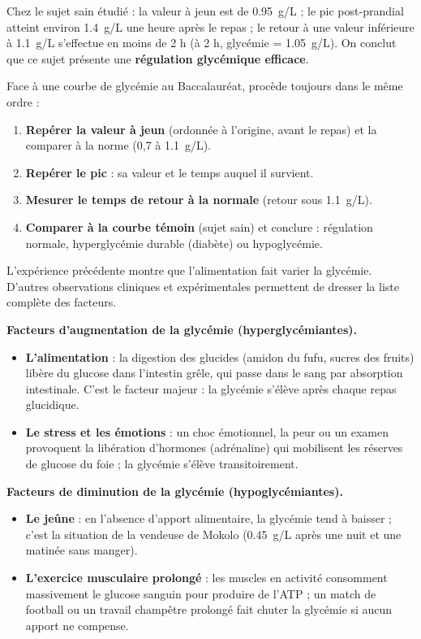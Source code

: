 \documentclass[11pt]{article}
\newcounter{popsec}
\newcounter{popsub}
\newcommand{\courssub}[1]{%
  \stepcounter{popsub}%
  \par\vspace{9pt}\noindent{\popxbold\fontsize{11.5}{13}\selectfont\color{popink}{\color{poporange}\thepopsec.\thepopsub}\hspace{6pt}#1}\par\nopagebreak\vspace{4pt}
}
\begin{document}
\begin{exemplebox}
Chez le sujet sain étudié : la valeur à jeun est de \SI{0,95}{g/L} ; le pic post-prandial atteint environ \SI{1,4}{g/L} une heure après le repas ; le retour à une valeur inférieure à \SI{1,1}{g/L} s'effectue en moins de 2 h (à 2 h, glycémie = \SI{1,05}{g/L}). On conclut que ce sujet présente une \textbf{régulation glycémique efficace}.
\end{exemplebox}

\begin{methode}
Face à une courbe de glycémie au Baccalauréat, procède toujours dans le même ordre :
\begin{enumerate}
\item \textbf{Repérer la valeur à jeun} (ordonnée à l'origine, avant le repas) et la comparer à la norme (0,7 à \SI{1,1}{g/L}).
\item \textbf{Repérer le pic} : sa valeur et le temps auquel il survient.
\item \textbf{Mesurer le temps de retour à la normale} (retour sous \SI{1,1}{g/L}).
\item \textbf{Comparer à la courbe témoin} (sujet sain) et conclure : régulation normale, hyperglycémie durable (diabète) ou hypoglycémie.
\end{enumerate}
\end{methode}

\courssub{Les facteurs de variation de la glycémie}

L'expérience précédente montre que l'alimentation fait varier la glycémie. D'autres observations cliniques et expérimentales permettent de dresser la liste complète des facteurs.

\textbf{Facteurs d'augmentation de la glycémie (hyperglycémiantes).}
\begin{itemize}
\item \textbf{L'alimentation} : la digestion des glucides (amidon du fufu, sucres des fruits) libère du glucose dans l'intestin grêle, qui passe dans le sang par absorption intestinale. C'est le facteur majeur : la glycémie s'élève après chaque repas glucidique.
\item \textbf{Le stress et les émotions} : un choc émotionnel, la peur ou un examen provoquent la libération d'hormones (adrénaline) qui mobilisent les réserves de glucose du foie ; la glycémie s'élève transitoirement.
\end{itemize}

\textbf{Facteurs de diminution de la glycémie (hypoglycémiantes).}
\begin{itemize}
\item \textbf{Le jeûne} : en l'absence d'apport alimentaire, la glycémie tend à baisser ; c'est la situation de la vendeuse de Mokolo (\SI{0,45}{g/L} après une nuit et une matinée sans manger).
\item \textbf{L'exercice musculaire prolongé} : les muscles en activité consomment massivement le glucose sanguin pour produire de l'ATP ; un match de football ou un travail champêtre prolongé fait chuter la glycémie si aucun apport ne compense.
\end{itemize}
\end{document}
